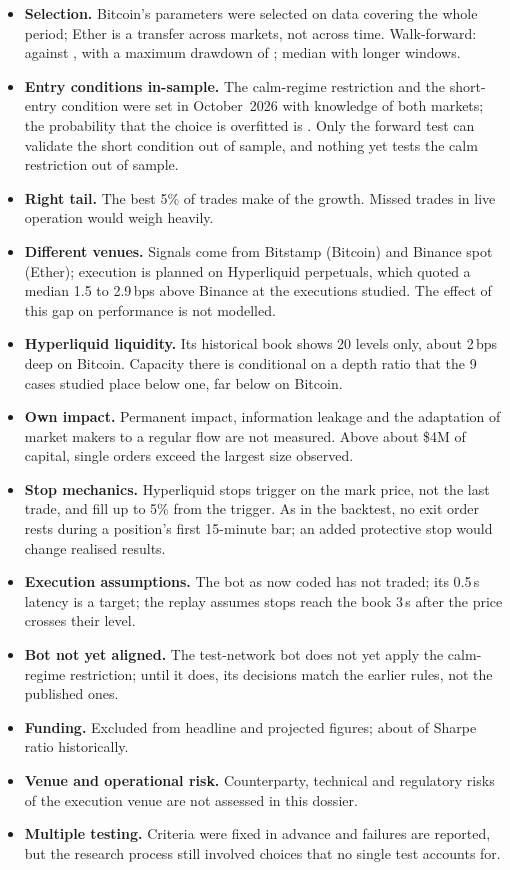 \documentclass[11pt,a4paper]{article}
\newcommand{\bps}{\,bps}
\begin{document}
\begin{itemize}
\item \textbf{Selection.} Bitcoin's parameters were selected on data covering the whole period; Ether is a transfer across markets,
  not across time. Walk-forward: \WfSharpe{} against \WfPreset, with a maximum drawdown of \WfDD; median \WflMedian{} with longer windows.
\item \textbf{Entry conditions in-sample.} The calm-regime restriction and the short-entry condition were set in October~2026 with
  knowledge of both markets; the probability that the choice is overfitted is \Pbo. Only the forward test can validate the short
  condition out of sample, and nothing yet tests the calm restriction out of sample.
\item \textbf{Right tail.} The best 5\% of trades make \TopFive{} of the growth. Missed trades in live operation would weigh heavily.
\item \textbf{Different venues.} Signals come from Bitstamp (Bitcoin) and Binance spot (Ether); execution is planned on Hyperliquid
  perpetuals, which quoted a median 1.5 to 2.9\bps{} above Binance at the executions studied. The effect of this gap on performance
  is not modelled.
\item \textbf{Hyperliquid liquidity.} Its historical book shows 20 levels only, about 2\bps{} deep on Bitcoin. Capacity there is
  conditional on a depth ratio that the 9 cases studied place below one, far below on Bitcoin.
\item \textbf{Own impact.} Permanent impact, information leakage and the adaptation of market makers to a regular flow are not
  measured. Above about \$4M of capital, single orders exceed the largest size observed.
\item \textbf{Stop mechanics.} Hyperliquid stops trigger on the mark price, not the last trade, and fill up to 5\% from the trigger.
  As in the backtest, no exit order rests during a position's first 15-minute bar; an added protective stop would change realised
  results.
\item \textbf{Execution assumptions.} The bot as now coded has not traded; its 0.5\,s latency is a target; the replay assumes stops
  reach the book 3\,s after the price crosses their level.
\item \textbf{Bot not yet aligned.} The test-network bot does not yet apply the calm-regime restriction; until it does, its
  decisions match the earlier rules, not the published ones.
\item \textbf{Funding.} Excluded from headline and projected figures; about \FundingDrag{} of Sharpe ratio historically.
\item \textbf{Venue and operational risk.} Counterparty, technical and regulatory risks of the execution venue are not assessed in
  this dossier.
\item \textbf{Multiple testing.} Criteria were fixed in advance and failures are reported, but the research process still involved
  choices that no single test accounts for.
\end{itemize}
\end{document}
